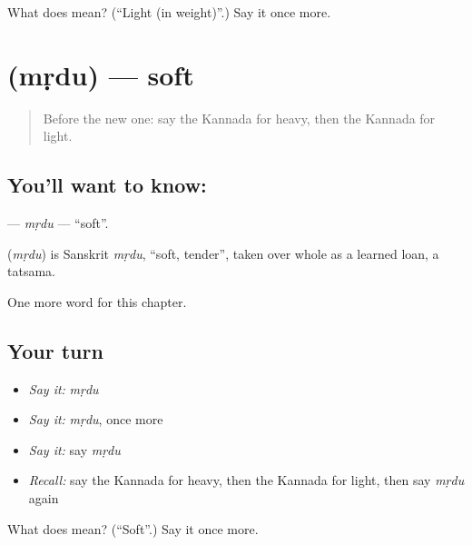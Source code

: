 \begin{tcolorbox}[breakable,colback=teal!4,colframe=teal!35!black,title={Before you move on}]
What does  mean? (\textquotedblleft{}Light (in weight)\textquotedblright{}.) Say it once more.
\end{tcolorbox}
\section[\texorpdfstring{\kn{ಮೃದು} (mṛdu)}{ಮೃದು (mṛdu)}]{ (mṛdu) — soft}

\label{lesson:KA-C141-mrdu}



\begin{quote}
Before the new one: say the Kannada for heavy, then the Kannada for light.
\end{quote}

\subsection*{You'll want to know: }
\textbf{} — \emph{mṛdu} — \textquotedblleft{}soft\textquotedblright{}.

\begin{cousinweb}
\textbf{} (\emph{mṛdu}) is Sanskrit \emph{mṛdu}, \textquotedblleft{}soft, tender\textquotedblright{}, taken over whole as a learned loan, a tatsama.
\end{cousinweb}

\begin{grammarlens}[title={What you've built}]
One more word for this chapter.
\end{grammarlens}

\subsection*{Your turn}
\begin{itemize}
\raggedright
  \item \emph{Say it:} \emph{mṛdu}
  \item \emph{Say it:} \emph{mṛdu}, once more
  \item \emph{Say it:} say \emph{mṛdu}
  \item \emph{Recall:} say the Kannada for heavy, then the Kannada for light, then say \emph{mṛdu} again
\end{itemize}

\begin{tcolorbox}[breakable,colback=teal!4,colframe=teal!35!black,title={Before you move on}]
What does  mean? (\textquotedblleft{}Soft\textquotedblright{}.) Say it once more.
\end{tcolorbox}

